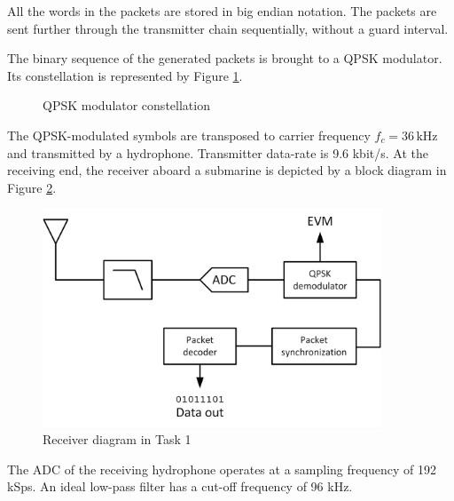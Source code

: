 \documentclass{article}
\begin{document}
All the words in the packets are stored in big endian notation. The packets are sent further through the transmitter chain sequentially, without a guard interval.

The binary sequence of the generated packets is brought to a QPSK modulator. Its constellation is represented by Figure \ref{fig:qpsk}.

\begin{figure}[h!]
\centering
{}
\caption{QPSK modulator constellation}
\label{fig:qpsk}
\end{figure}

The QPSK-modulated symbols are transposed to carrier frequency $f_c = 36 \,\textrm{kHz}$ and transmitted by a hydrophone. Transmitter data-rate is 9.6 kbit/s. At the receiving end, the receiver aboard a submarine is depicted by a block diagram in Figure \ref{fig:task1}.

\begin{figure}[h!]
\centering
\includegraphics[width=0.9\textwidth]{Images/Task1.png}
\caption{Receiver diagram in Task 1}
\label{fig:task1}
\end{figure}

The ADC of the receiving hydrophone operates at a sampling frequency of 192 kSps. An ideal low-pass filter has a cut-off frequency of 96 kHz.
\end{document}
